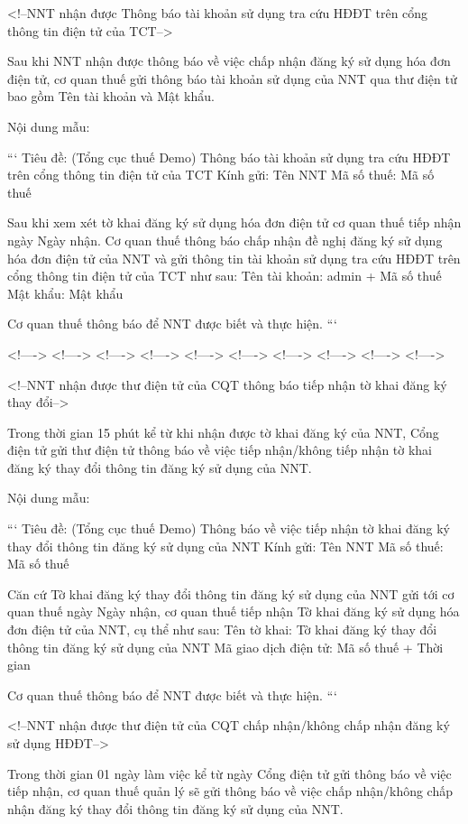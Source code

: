 <!--NNT nhận được Thông báo tài khoản sử dụng tra cứu HĐĐT trên cổng thông tin điện tử của TCT-->

Sau khi NNT nhận được thông báo về việc chấp nhận đăng ký sử dụng hóa đơn điện tử, cơ quan thuế gửi thông báo tài khoản sử dụng của NNT qua thư điện tử bao gồm Tên tài khoản và Mật khẩu.

Nội dung mẫu:

```
Tiêu đề: (Tổng cục thuế Demo) Thông báo tài khoản sử dụng tra cứu HĐĐT trên cổng thông tin điện tử của TCT
Kính gửi: {{Tên NNT}}
Mã số thuế: {{Mã số thuế}}

Sau khi xem xét tờ khai đăng ký sử dụng hóa đơn điện tử cơ quan thuế tiếp nhận ngày {{Ngày nhận}}.
Cơ quan thuế thông báo chấp nhận đề nghị đăng ký sử dụng hóa đơn điện tử của NNT và gửi thông tin tài khoản sử dụng tra cứu HĐĐT trên cổng thông tin điện tử của TCT như sau:
Tên tài khoản: {{admin + Mã số thuế}}
Mật khẩu: {{Mật khẩu}}

Cơ quan thuế thông báo để NNT được biết và thực hiện.
```

<!---->
<!---->
<!---->
<!---->
<!---->
<!---->
<!---->
<!---->
<!---->
<!---->

<!--NNT nhận được thư điện tử của CQT thông báo tiếp nhận tờ khai đăng ký thay đổi-->

Trong thời gian 15 phút kể từ khi nhận được tờ khai đăng ký của NNT, Cổng điện tử gửi thư điện tử thông báo về việc tiếp nhận/không tiếp nhận tờ khai đăng ký thay đổi thông tin đăng ký sử dụng của NNT.

Nội dung mẫu:

```
Tiêu đề: (Tổng cục thuế Demo) Thông báo về việc tiếp nhận tờ khai đăng ký thay đổi thông tin đăng ký sử dụng của NNT
Kính gửi: {{Tên NNT}}
Mã số thuế: {{Mã số thuế}}

Căn cứ Tờ khai đăng ký thay đổi thông tin đăng ký sử dụng của NNT gửi tới cơ quan thuế ngày {{Ngày nhận}}, cơ quan thuế tiếp nhận Tờ khai đăng ký sử dụng hóa đơn điện tử của NNT, cụ thể như sau:
Tên tờ khai: Tờ khai đăng ký thay đổi thông tin đăng ký sử dụng của NNT
Mã giao dịch điện tử: {{Mã số thuế + Thời gian}}

Cơ quan thuế thông báo để NNT được biết và thực hiện.
```

<!--NNT nhận được thư điện tử của CQT chấp nhận/không chấp nhận đăng ký sử dụng HĐĐT-->

Trong thời gian 01 ngày làm việc kể từ ngày Cổng điện tử gửi thông báo về việc tiếp nhận, cơ quan thuế quản lý sẽ gửi thông báo về việc chấp nhận/không chấp nhận đăng ký thay đổi thông tin đăng ký sử dụng của NNT.

